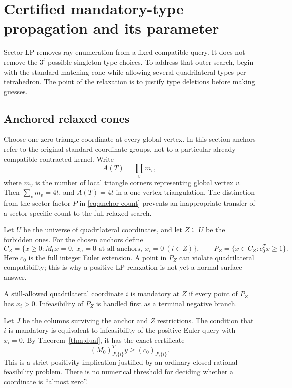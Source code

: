 \section{Certified mandatory-type propagation and its parameter}\label{sec:propagation}

Sector LP removes ray enumeration from a fixed compatible query. It does not remove the $3^t$ possible singleton-type choices. To address that outer search, begin with the standard matching cone while allowing several quadrilateral types per tetrahedron. The point of the relaxation is to justify type deletions before making guesses.

\subsection{Anchored relaxed cones}

Choose one zero triangle coordinate at every global vertex. In this section anchors refer to the original standard coordinate groups, not to a particular already-compatible contracted kernel. Write
\[
 A(T)=\prod_v m_v,
\]
where $m_v$ is the number of local triangle corners representing global vertex $v$. Then $\sum_vm_v=4t$, and $A(T)=4t$ in a one-vertex triangulation. The distinction from the sector factor $P$ in \eqref{eq:anchor-count} prevents an inappropriate transfer of a sector-specific count to the full relaxed search.

Let $U$ be the universe of quadrilateral coordinates, and let $Z\subseteq U$ be the forbidden ones. For the chosen anchors define
\begin{equation}\label{eq:relaxation}
 C_Z=\{x\ge0:M_0x=0,\ x_a=0\text{ at all anchors},\ x_i=0\ (i\in Z)\},
 \qquad P_Z=\{x\in C_Z:c_0^Tx\ge1\}.
\end{equation}
Here $c_0$ is the full integer Euler extension. A point in $P_Z$ can violate quadrilateral compatibility; this is why a positive LP relaxation is not yet a normal-surface answer.

\begin{definition}
A still-allowed quadrilateral coordinate $i$ is mandatory at $Z$ if every point of $P_Z$ has $x_i>0$. Infeasibility of $P_Z$ is handled first as a terminal negative branch.
\end{definition}

Let $J$ be the columns surviving the anchor and $Z$ restrictions. The condition that $i$ is mandatory is equivalent to infeasibility of the positive-Euler query with $x_i=0$. By Theorem~\ref{thm:dual}, it has the exact certificate
\begin{equation}\label{eq:mandatory-dual}
 (M_0)_{J\setminus\{i\}}^Ty\ge(c_0)_{J\setminus\{i\}}.
\end{equation}
This is a strict positivity implication justified by an ordinary closed rational feasibility problem. There is no numerical threshold for deciding whether a coordinate is ``almost zero''.

